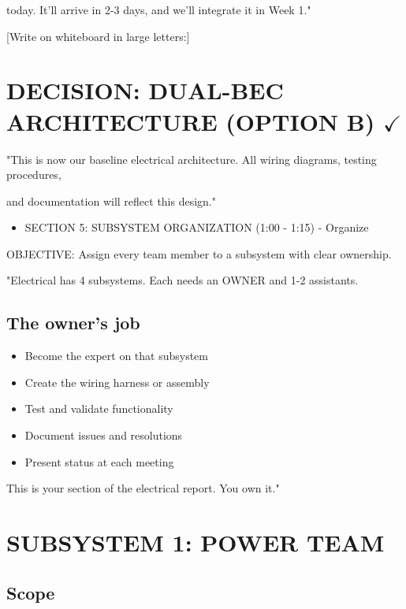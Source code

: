 \documentclass[11pt,letterpaper]{article}
\begin{document}
{today. It'll arrive in 2-3 days, and we'll integrate it in Week 1."\par

[Write on whiteboard in large letters:]\par

\section{DECISION: DUAL-BEC ARCHITECTURE (OPTION B) $\checkmark$}

"This is now our baseline electrical architecture. All wiring diagrams, testing procedures,\par

and documentation will reflect this design."\par

\begin{itemize}
  \item SECTION 5: SUBSYSTEM ORGANIZATION (1:00 - 1:15) - Organize
\end{itemize}

OBJECTIVE: Assign every team member to a subsystem with clear ownership.\par

"Electrical has 4 subsystems. Each needs an OWNER and 1-2 assistants.\par

\subsection{The owner's job}

\begin{itemize}
  \item Become the expert on that subsystem
  \item Create the wiring harness or assembly
  \item Test and validate functionality
  \item Document issues and resolutions
  \item Present status at each meeting
\end{itemize}

This is your section of the electrical report. You own it."\par

\section{SUBSYSTEM 1: POWER TEAM}

\subsection{Scope}

}
\end{document}
